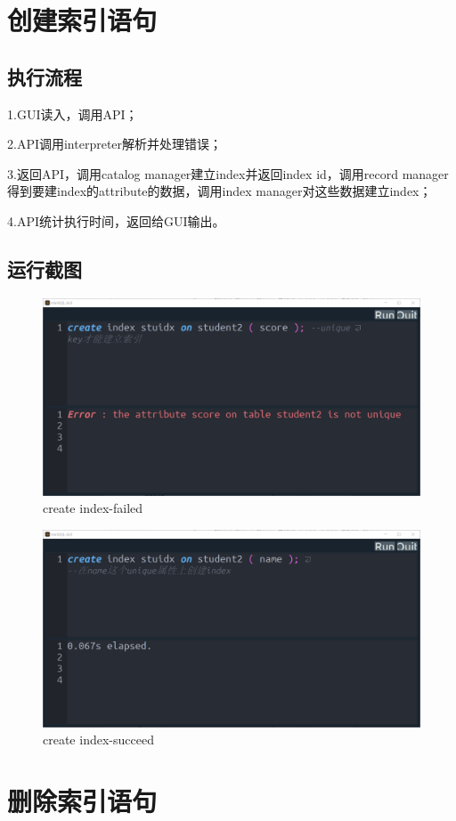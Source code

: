 \documentclass[UTF8]{ctexrep} %
\begin{document}
\section{创建索引语句}
\subsection{执行流程}
1.GUI读入，调用API；
\par
2.API调用interpreter解析并处理错误；
\par
3.返回API，调用catalog manager建立index并返回index id，调用record manager得到要建index的attribute的数据，调用index manager对这些数据建立index；
\par
4.API统计执行时间，返回给GUI输出。
\subsection{运行截图}
\begin{figure}[H]
    \centering
    \includegraphics[width=0.8\linewidth]{figure/3.1.png}
    \caption{create index-failed}
    \label{fig:runtime3.1}
\end{figure}
\begin{figure}[H]
    \centering
    \includegraphics[width=0.8\linewidth]{figure/3.2.png}
    \caption{create index-succeed}
    \label{fig:runtime3.2}
\end{figure}
\section{删除索引语句}
\end{document}
